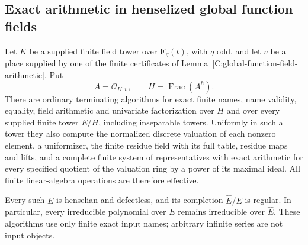 \subsection{Exact arithmetic in henselized global function fields}
\label{C:henselian-global-arithmetic-subsection}

\begin{theorem}
\label{C:henselian-global-field-arithmetic}
Let $K$ be a supplied finite field tower over
$\mathbf F_q(t)$, with $q$ odd, and let $v$ be
a place supplied by one of the finite certificates
of Lemma~\ref{C:global-function-field-arithmetic}.
Put
\[
 A=\mathcal O_{K,v},\qquad
 H=\operatorname{Frac}(A^h).                              \tag{C.3.HA1}
\]
There are ordinary terminating algorithms for
exact finite names, name validity, equality,
field arithmetic and univariate factorization
over $H$ and over every supplied finite tower
$E/H$, including inseparable towers.
Uniformly in such a tower they also compute
the normalized discrete valuation of each
nonzero element, a uniformizer, the finite
residue field with its full table, residue
maps and lifts, and a complete finite system
of representatives with exact arithmetic
for every specified quotient of the valuation
ring by a power of its maximal ideal.
All finite linear-algebra operations are
therefore effective.

Every such $E$ is henselian and defectless,
and its completion $\widehat E/E$ is regular.
In particular, every irreducible polynomial
over $E$ remains irreducible over
$\widehat E$.
These algorithms use only finite exact
input names; arbitrary infinite series
are not input objects.
\end{theorem}
